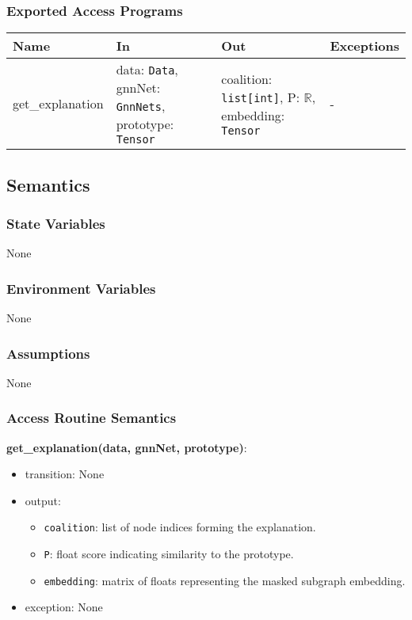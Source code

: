 \documentclass[12pt, titlepage]{article}
\begin{document}
\subsubsection{Exported Access Programs}

\begin{center}
\begin{tabular}{p{3cm} p{5cm} p{4.5cm} p{3cm}}
\hline
\textbf{Name} & \textbf{In} & \textbf{Out} & \textbf{Exceptions} \\
\hline
get\_explanation & data: \texttt{Data}, gnnNet: \texttt{GnnNets}, prototype: \texttt{Tensor} & coalition: \texttt{list[int]}, P: \(\mathbb{R}\), embedding: \texttt{Tensor} & - \\
\hline
\end{tabular}
\end{center}

\subsection{Semantics}

\subsubsection{State Variables}
None

\subsubsection{Environment Variables}
None

\subsubsection{Assumptions}
None

\subsubsection{Access Routine Semantics}

\noindent \textbf{get\_explanation(data, gnnNet, prototype)}:
\begin{itemize}
  \item transition: None
  \item output:
  \begin{itemize}
    \item \texttt{coalition}: list of node indices forming the explanation.
    \item \texttt{P}: float score indicating similarity to the prototype.
    \item \texttt{embedding}: matrix of floats representing the masked subgraph embedding.
  \end{itemize}
  \item exception: None
\end{itemize}
\end{document}
